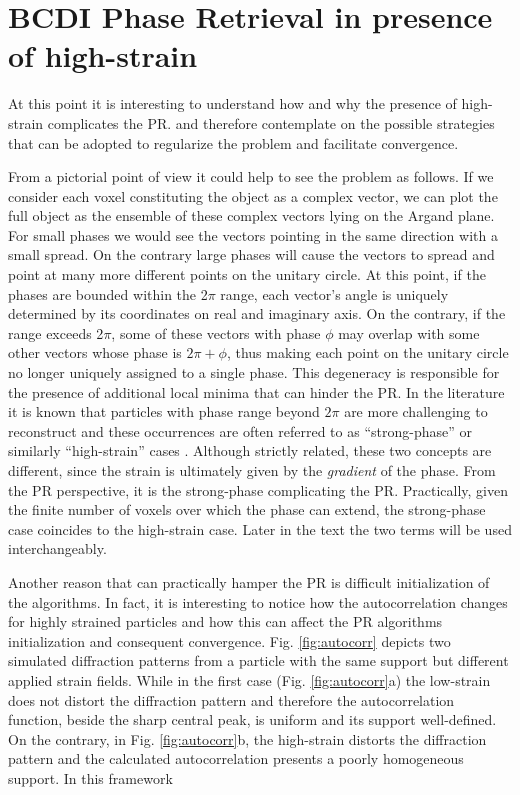 \section{BCDI Phase Retrieval in presence of high-strain}

At this point it is interesting to understand how and why the presence of high-strain complicates the PR. 
and therefore contemplate on the possible strategies that can be adopted to regularize the problem and facilitate convergence. 

From a pictorial point of view it could help to see the problem as follows. If we consider each voxel constituting 
the object as a complex vector, we can plot the full object as the ensemble of these complex 
vectors lying on the Argand plane. For small phases we would see the vectors pointing in the same direction with a small 
spread. On the contrary large phases will cause the vectors to spread and point at many more different points on the 
unitary circle. At this point, if the phases are bounded within the 2$\pi$ range, each vector's angle is uniquely determined by 
its coordinates on real and imaginary axis. On the contrary, if the range exceeds 2$\pi$, some of these vectors with 
phase $\phi$ may overlap with some other vectors whose phase is $2\pi + \phi$, thus making each point on the unitary 
circle no longer uniquely assigned to a single phase. This degeneracy is responsible for the presence of additional 
local minima that can hinder the PR. 
In the literature it is known that particles with phase range beyond $2\pi$ are more challenging to reconstruct and these 
occurrences are often referred to as ``strong-phase'' or similarly ``high-strain'' cases \cite{Cha_2010, NewtonStrain_2010, Pavlov2017}. 
Although strictly related, 
these two concepts are different, since the strain is ultimately given by the \textit{gradient} of the phase. From the 
PR perspective, it is the strong-phase complicating the PR. Practically, given the finite number of voxels over which 
the phase can extend, the strong-phase case coincides to the high-strain case. Later in the text the two terms will be 
used interchangeably. 

Another reason that can practically hamper the PR is difficult initialization of the algorithms. In fact, it is 
interesting to notice how the autocorrelation changes for highly strained particles and
how this can affect the PR algorithms initialization and consequent convergence. Fig. \ref{fig:autocorr}
depicts two simulated diffraction patterns from a particle with the same support but different applied strain fields. 
While in the first case (Fig. \ref{fig:autocorr}a) the low-strain does not distort the diffraction pattern and therefore the autocorrelation 
function, beside the sharp central peak, is uniform and its support well-defined. On the contrary, in Fig. \ref{fig:autocorr}b, 
the high-strain distorts the diffraction pattern and the calculated autocorrelation presents a poorly homogeneous support. 
In this framework 

